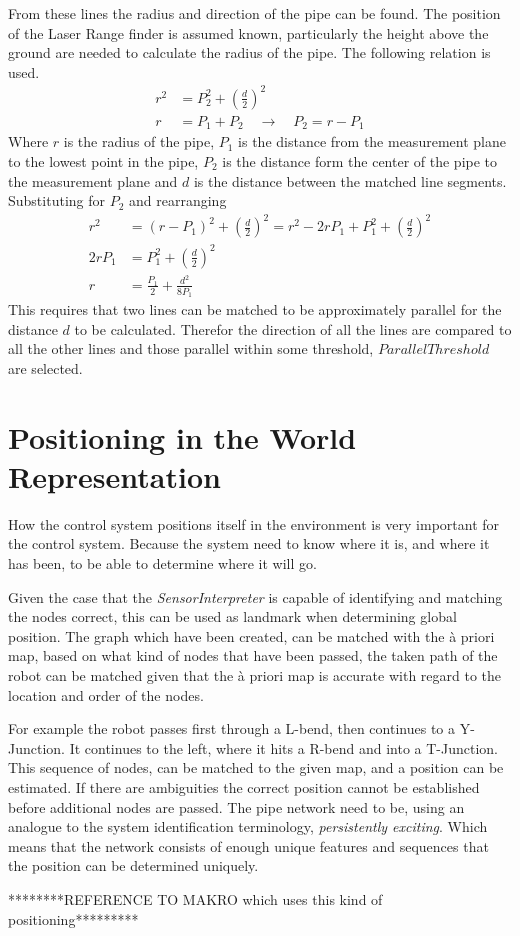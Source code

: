From these lines the radius and direction of the pipe can be found. The position of the
Laser Range finder is assumed known, particularly the height above the ground are needed
to calculate the radius of the pipe. The following relation is used.
\begin{align}
    r^2 &= P_2^2 + (\frac{d}{2})^2 \\
    r &= P_1 + P_2  \quad \rightarrow \quad P_2 = r - P_1
\end{align}
       Where $r$ is the radius of the pipe, $P_1$ is the distance from the measurement plane to
the lowest point in the pipe, $P_2$ is the distance form the center of the pipe to the
measurement plane and $d$ is the distance between the matched line segments. Substituting
for $P_2$ and rearranging
\begin{equation}
    \begin{aligned}
        r^2& = (r - P_1)^2 + (\frac{d}{2})^2 = r^2 - 2 r P_1 + P_1^2 + (\frac{d}{2})^2 \\
        2 r P_1 &= P_1^2 + (\frac{d}{2})^2 \\
        r &= \frac{P_1}{2} + \frac{d^2}{8 P_1}
    \end{aligned}
\end{equation}
This requires that two lines can be matched to be approximately parallel for the distance
$d$ to be calculated. Therefor the direction of all the lines are compared to all the
other lines and those parallel within some threshold, $ParallelThreshold$ are selected.


\section{Positioning in the World Representation}
How the control system positions itself in the environment is very important for the
control system. Because the system need to know where it is, and where it has been, to be
able to determine where it will go. 

Given the case that the \emph{SensorInterpreter} is capable of identifying and matching
the nodes correct, this can be used as landmark when determining global position. The
graph which have been created, can be matched with the \`a priori map, based on what kind
of nodes that have been passed, the taken path of the robot can be matched given that the
\`a priori map is accurate with regard to the location and order of the nodes. 

For example the robot passes first through a L-bend, then continues to a Y-Junction. It
continues to the left, where it hits a R-bend and into a T-Junction. This sequence of
nodes, can be matched to the given map, and a position can be estimated. If there are
ambiguities the correct position cannot be established before additional nodes are passed.
The pipe network need to be, using an analogue to the system identification terminology, 
\emph{persistently exciting}. Which means that the network consists of enough unique features and
sequences that the position can be determined uniquely. 

********REFERENCE TO MAKRO which uses this kind of positioning*********

